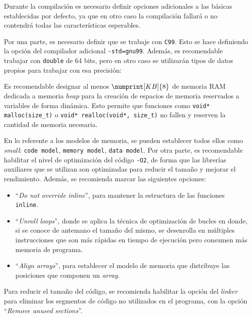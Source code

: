 Durante la compilación es necesario definir opciones adicionales a las básicas
establecidas por defecto, ya que en otro caso la compilación fallará o no contendrá
todas las características esperables.

Por una parte, es necesario definir que se trabaje con \texttt{C99}. Esto se hace
definiendo la opción del compilador adicional \texttt{-std=gnu99}. Además, es recomendable
trabajar con \texttt{double} de 64 bits, pero en otro caso se utilizarán tipos de datos
propios para trabajar con esa precisión:



Es recomendable designar al menos $\numprint[KB]{8}$ de memoria RAM dedicada a memoria
\textit{heap} para la creación de espacios de memoria reservados a variables de
forma dinámica. Esto permite que funciones como \lstinline[style=C]{void* malloc(size_t)} o
\lstinline[style=C]{void* realloc(void*, size_t)} no fallen y reserven la cantidad de memoria necesaria.

En lo referente a los modelos de memoria, se pueden establecer todos ellos como
\textit{small}: \texttt{code model}, \texttt{memory model}, \texttt{data model}. Por
otra parte, es recomendable habilitar el nivel de optimización del código \texttt{-O2},
de forma que las librerías auxiliares que se utilizan son optimizadas para reducir
el tamaño y mejorar el rendimiento. Además, se recomienda marcar las siguientes opciones:

\begin{itemize}
    \item ``\textit{Do not override inline}'', para mantener la estructura de las funciones
    \texttt{inline}.
    \item ``\textit{Unroll loops}'', donde se aplica la técnica de optimización de
    bucles en donde, si se conoce de antemano el tamaño del mismo, se desenrolla
    en múltiples instrucciones que son más rápidas en tiempo de ejecución pero
    consumen más memoria de programa.
    \item ``\textit{Align arrays}'', para establecer el modelo de memoria que 
    distribuye las posiciones que componen un \textit{array}.
\end{itemize}

Para reducir el tamaño del código, se recomienda habilitar la opción del \textit{linker} para eliminar
los segmentos de código no utilizados en el programa, con la opción ``\textit{Remove
unused sections}''.

